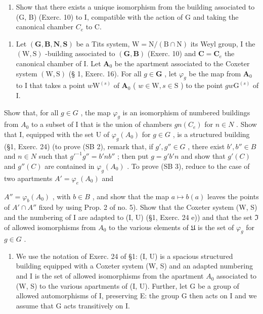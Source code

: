 \begin{enumerate}
\def\labelenumi{\alph{enumi})}
\setcounter{enumi}{4}
\tightlist
\item
  Show that there exists a unique isomorphism from the building associated to (G, B) (Exerc. 10) to I, compatible with the action of G and taking the canonical chamber \(C_{e}\) to C.
\end{enumerate}

\begin{enumerate}
\def\labelenumi{\arabic{enumi})}
\setcounter{enumi}{11}
\tightlist
\item
  Let \((\mathbf{G},\mathbf{B},\mathbf{N},\mathbf{S})\) be a Tits system, \(\mathrm{W} = \mathrm{N} / (\mathrm{B}\cap \mathrm{N})\) its Weyl group, I the \((\mathrm{W},\mathrm{S})\) -building associated to \((\mathbf{G},\mathbf{B})\) (Exerc. 10) and \(\mathbf{C} = \mathbf{C}_e\) the canonical chamber of I. Let \(\mathbf{A}_0\) be the apartment associated to the Coxeter system \((\mathrm{W},\mathrm{S})\) (§ 1, Exerc. 16). For all \(g\in \mathbf{G}\) , let \(\varphi_g\) be the map from \(\mathbf{A}_0\) to I that takes a point \(w\mathrm{W}^{(s)}\) of \(\mathbf{A}_0\) ( \(w\in \mathrm{W}, s\in \mathrm{S}\) ) to the point \(gw\mathrm{G}^{(s)}\) of I.
\end{enumerate}

Show that, for all \(g \in G\) , the map \(\varphi_{g}\) is an isomorphism of numbered buildings from \(A_{0}\) to a subset of I that is the union of chambers \(gn(C_{e})\) for \(n \in N\) . Show that I, equipped with the set U of \(\varphi_{g}(A_{0})\) for \(g \in G\) , is a structured building (§1, Exerc. 24) (to prove (SB 2), remark that, if \(g', g'' \in G\) , there exist \(b', b'' \in B\) and \(n \in N\) such that \(g'^{-1}g'' = b'nb''\) ; then put \(g = g'b'n\) and show that \(g'(C)\) and \(g''(C)\) are contained in \(\varphi_{g}(A_{0})\) . To prove (SB 3), reduce to the case of two apartments \(A' = \varphi_{e}(A_{0})\) and

\(A'' = \varphi_b(A_0)\) , with \(b \in B\) , and show that the map \(a \mapsto b(a)\) leaves the points of \(A' \cap A''\) fixed by using Prop. 2 of no. 5). Show that the Coxeter system (W, S) and the numbering of I are adapted to (I, U) (§1, Exerc. 24 e)) and that the set \(\mathfrak{I}\) of allowed isomorphisms from \(A_0\) to the various elements of \(\mathfrak{U}\) is the set of \(\varphi_g\) for \(g \in G\) .

\begin{enumerate}
\def\labelenumi{\arabic{enumi})}
\setcounter{enumi}{12}
\tightlist
\item
  We use the notation of Exerc. 24 of §1: (I, U) is a spacious structured building equipped with a Coxeter system (W, S) and an adapted numbering and I is the set of allowed isomorphisms from the apartment \(A_{0}\) associated to (W, S) to the various apartments of (I, U). Further, let G be a group of allowed automorphisms of I, preserving E: the group G then acts on I and we assume that G acts transitively on I.
\end{enumerate}

